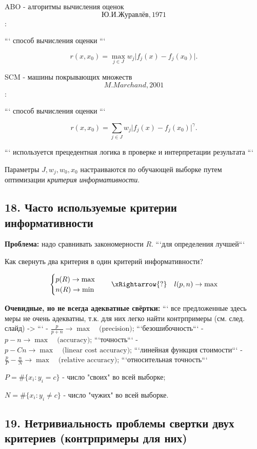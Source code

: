 ABO - алгоритмы вычисления оценок \[Ю.И. Журавлёв, 1971\]:

```
способ вычисления оценки
```

$$r{(x, x_0)} = \max_{j \in J}{w_j{\vert f_j{(x)} - f_j{(x_0)} \vert}}.$$

SCM - машины покрывающих множеств \[M. Marchand, 2001\]:

```
способ вычисления оценки
```

$$r{(x, x_0)} = \sum_{j \in J}{w_j{\vert f_j{(x)} - f_j{(x_0)} \vert}^{\gamma}}.$$

```
используется прецедентная логика в проверке и интерпретации результата
```

Параметры $J, w_j, w_0, x_0$ настраиваются по обучающей выборке путем
оптимизации \textit{критерия информативности}.

\subsection{18. Часто используемые критерии информативности}

\textbf{Проблема:} надо сравнивать закономерности
$R$. ```для определения лучшей```

Как свернуть два критерия в один критерий информативности?

$$
\begin{cases}
p{\left( R \right)} \rightarrow \max \\
n{\left( R \right)} \rightarrow \min
\end{cases}
\quad
\xRightarrow{?}
\quad
l{\left( p, n \right)} \rightarrow \max
$$

\textbf{Очевидные, но не всегда адекватные свёртки:}
```
все предложенные здесь меры не очень адекватны, т.к. для них легко найти
контрпримеры (см. след. слайд) ->
```
- $\displaystyle \frac{p}{p+n} \rightarrow \max \quad \text{(precision);}$
```безошибочность```
- $\displaystyle p - n \rightarrow \max \quad \text{(accuracy);}$
```точность```
- $\displaystyle p - Cn \rightarrow \max \quad \text{(linear cost accuracy);}$
```линейная функция стоимости```
- $\displaystyle \frac{p}{P} - \frac{n}{N} \rightarrow \max \quad \text{(relative accuracy);}$ ```относительная точность```

$P = \# {\lbrace x_i \! : y_i = c \rbrace}$ - число "своих" во всей выборке;

$N = \# {\lbrace x_i \! : y_i \neq c \rbrace}$ - число "чужих" во всей выборке.

\subsection{19. Нетривиальность проблемы свертки двух критериев (контрпримеры для них)}

